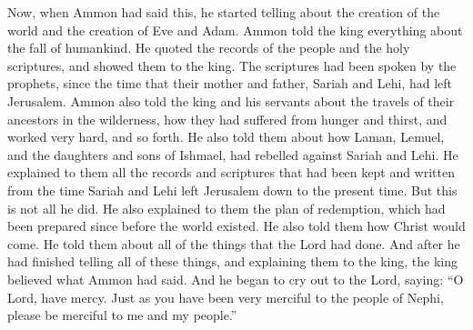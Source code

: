 Now, when Ammon had said this, he started telling about the creation of the world and the creation of Eve and Adam. Ammon told the king everything about the fall of humankind. He quoted the records of the people and the holy scriptures, and showed them to the king. The scriptures had been spoken by the prophets, since the time that their mother and father, Sariah and Lehi, had left Jerusalem.
\bverse \iffalse And he also rehearsed unto them (for it was unto the king and to his servants) all the journeyings of their fathers in the wilderness, and all their sufferings with hunger and thirst, and their travail, and so forth. \fi
Ammon also told the king and his servants about the travels of their ancestors in the wilderness, how they had suffered from hunger and thirst, and worked very hard, and so forth.
\bverse \iffalse And he also rehearsed unto them concerning the rebellions of Laman and Lemuel, and the sons of Ishmael, yea, all their rebellions did he relate unto them; and he expounded unto them all the records and scriptures from the time that Lehi left Jerusalem down to the present time. \fi
He also told them about how Laman, Lemuel, and the daughters and sons of Ishmael, had rebelled against Sariah and Lehi. He explained to them all the records and scriptures that had been kept and written from the time Sariah and Lehi left Jerusalem down to the present time.
\bverse \iffalse But this is not all; for he expounded unto them the plan of redemption, which was prepared from the foundation of the world; and he also made known unto them concerning the coming of Christ, and all the works of the Lord did he make known unto them. \fi
But this is not all he did. He also explained to them the plan of redemption, which had been prepared since before the world existed. He also told them how Christ would come. He told them about all of the things that the Lord had done.
\bverse \iffalse And it came to pass that after he had said all these things, and expounded them to the king, that the king believed all his words. \fi
And after he had finished telling all of these things, and explaining them to the king, the king believed what Ammon had said.
\bverse \iffalse And he began to cry unto the Lord, saying: O Lord, have mercy; according to thy abundant mercy which thou hast had upon the people of Nephi, have upon me, and my people. \fi
And he began to cry out to the Lord, saying: ``O Lord, have mercy. Just as you have been very merciful to the people of Nephi, please be merciful to me and my people.''
